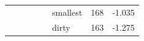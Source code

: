 \documentclass[smallextended,natbib]{svjour3}       %
\providecommand{\DIFdelbegin}{} %
\providecommand{\DIFaddendFL}{} %
\newcommand{\DIFscaledelfig}{0.5}
\newlength{\DIFdelgraphicswidth} %
\newlength{\DIFdelgraphicsheight} %
\newcommand{\DIFdelincludegraphics}[2][]{%
\sbox{\DIFdelgraphicsbox}{\DIFOincludegraphics[#1]{#2}}%
\settoboxwidth{\DIFdelgraphicswidth}{\DIFdelgraphicsbox} %
\settoboxtotalheight{\DIFdelgraphicsheight}{\DIFdelgraphicsbox} %
\scalebox{\DIFscaledelfig}{%
\parbox[b]{\DIFdelgraphicswidth}{\usebox{\DIFdelgraphicsbox}\\[-\baselineskip] \rule{\DIFdelgraphicswidth}{0em}}\llap{\resizebox{\DIFdelgraphicswidth}{\DIFdelgraphicsheight}{%
\setlength{\unitlength}{\DIFdelgraphicswidth}%
\begin{picture}(1,1)%
\thicklines\linethickness{2pt} %
{\color[rgb]{1,0,0}\put(0,0){\framebox(1,1){}}}%
{\color[rgb]{1,0,0}\put(0,0){\line( 1,1){1}}}%
{\color[rgb]{1,0,0}\put(0,1){\line(1,-1){1}}}%
\end{picture}%
}\hspace*{3pt}}} %
} %
\DeclareRobustCommand{\DIFdelbegin}{\DIFOdelbegin \let\includegraphics\DIFdelincludegraphics} %
\DeclareRobustCommand{\DIFaddendFL}{\DIFOaddendFL \let\includegraphics\DIFOincludegraphics} %
\begin{document}
\begin{table}[h]
{\begin{tabular}{clccl|l|c|c|}
                                                                         &                                           &                                         &                                          &                                & smallest                           & 168                & -1.035              \\ \cline{6-8} 
                                                                         &                                           &                                         &                                          &                                & dirty                              & 163                & -1.275              \\ \cline{6-8} 
\end{tabular}%
}
\DIFaddendFL \end{table}

\DIFdelbegin %
\end{document}
